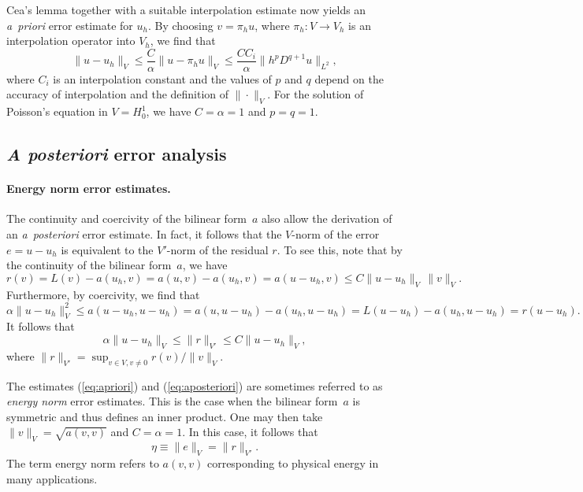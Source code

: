 Cea's lemma together with a suitable interpolation estimate now yields
an \emph{a~priori} error estimate for $u_h$. By choosing $v = \pi_h
u$, where $\pi_h : V \rightarrow V_h$ is an interpolation operator
into $V_h$, we find that
\begin{equation} \label{eq:apriori}
  \|u - u_h\|_V
  \leqslant \frac{C}{\alpha} \|u - \pi_h u\|_V
  \leqslant \frac{C C_i}{\alpha} \|h^p D^{q + 1} u\|_{L^2},
\end{equation}
where $C_i$ is an interpolation constant and the values of $p$ and $q$
depend on the accuracy of interpolation and the definition of
$\|\cdot\|_V$. For the solution of Poisson's equation in $V = H^1_0$,
we have $C = \alpha = 1$ and $p = q = 1$.

\subsection{\emph{A posteriori} error analysis}

\paragraph{Energy norm error estimates.}

The continuity and coercivity of the bilinear form~$a$ also allow the
derivation of an \emph{a~posteriori} error estimate.  In fact, it
follows that the $V$-norm of the error $e = u - u_h$ is equivalent to
the $V'$-norm of the residual $r$. To see this, note that by the
continuity of the bilinear form~$a$, we have
\begin{equation}
  r(v)
  = L(v) - a(u_h, v) = a(u, v) - a(u_h, v) = a(u - u_h, v)
  \leqslant C \|u - u_h\|_V \, \|v\|_V.
\end{equation}
Furthermore, by coercivity, we find that
\begin{equation}
  \alpha \|u - u_h\|^2_V
  \leqslant a(u - u_h, u - u_h)
  = a(u, u - u_h) - a(u_h, u - u_h)
  = L(u - u_h) - a(u_h, u - u_h) = r(u - u_h).
\end{equation}
It follows that
\begin{equation} \label{eq:aposteriori}
  \alpha \|u - u_h\|_V \leqslant \|r\|_{V'} \leqslant C \|u - u_h\|_V,
\end{equation}
where $\|r\|_{V'} = \sup_{v \in V, v \neq 0} r(v)/ \|v\|_V$.

The estimates (\ref{eq:apriori}) and (\ref{eq:aposteriori}) are
sometimes referred to as \emph{energy norm} error estimates. This is
the case when the bilinear form~$a$ is symmetric and thus defines an
inner product. One may then take $\|v\|_V = \sqrt{a(v, v)}$ and $C =
\alpha = 1$. In this case, it follows that
\begin{equation} \label{eq:aposteriori,energynorm}
  \eta \equiv \|e\|_V = \|r\|_{V'}.
\end{equation}
The term energy norm refers to $a(v, v)$ corresponding to physical
energy in many applications.

